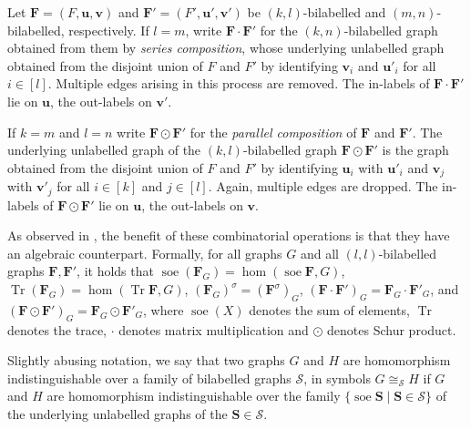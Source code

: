 \documentclass[a4paper,onecolumn,11pt,accepted=2026-01-06]{quantumarticle}
\theoremstyle{plain}
\theoremstyle{remark}
\theoremstyle{definition}
\DeclareMathOperator{\tr}{Tr}
\DeclareMathOperator{\soe}{soe}
\begin{document}
Let $\boldsymbol{F} = (F, \boldsymbol{u}, \boldsymbol{v})$ and $\boldsymbol{F}' = (F', \boldsymbol{u}', \boldsymbol{v}')$ be $(k,l)$-bilabelled and $(m,n)$-bilabelled, respectively.
If $l = m$, write $\boldsymbol{F} \cdot \boldsymbol{F}'$ for the $(k, n)$-bilabelled graph obtained from them by \emph{series composition}, whose underlying unlabelled graph obtained from the disjoint union of $F$ and $F'$ by identifying $\boldsymbol{v}_i$ and $\boldsymbol{u}'_i$ for all $i \in [l]$. 
Multiple edges arising in this process are removed. 
The in-labels of $\boldsymbol{F} \cdot \boldsymbol{F}'$ lie on $\boldsymbol{u}$, the out-labels on $\boldsymbol{v}'$.


If $k = m$ and $l = n$ %
write $\boldsymbol{F} \odot \boldsymbol{F}'$ for the \emph{parallel composition} of $\boldsymbol{F}$ and $\boldsymbol{F}'$. 
The underlying unlabelled graph of the $(k, l)$-bilabelled graph $\boldsymbol{F} \odot \boldsymbol{F}'$ is the graph obtained from the disjoint union of $F$ and $F'$ by identifying $\boldsymbol{u}_i$ with $\boldsymbol{u}'_i$ and $\boldsymbol{v}_j$ with $\boldsymbol{v}'_j$  for all $i \in [k]$ and $j \in [l]$. 
Again, multiple edges are dropped. The in-labels of $\boldsymbol{F} \odot \boldsymbol{F}'$ lie on $\boldsymbol{u}$, the out-labels on $\boldsymbol{v}$.
    
As observed in \cite{david-laura,grohe_homomorphism_2022}, the benefit of these combinatorial operations is that they have an algebraic counterpart. Formally, for all graphs $G$ and all $(l, l)$-bilabelled graphs $\boldsymbol{F}, \boldsymbol{F}'$, it holds that $\soe(\boldsymbol{F}_G) = \hom(\soe \boldsymbol{F}, G) $, $\tr(\boldsymbol{F}_G) = \hom(\tr \boldsymbol{F}, G)$, $(\boldsymbol{F}_G)^\sigma = (\boldsymbol{F}^\sigma)_G$, $(\boldsymbol{F} \cdot \boldsymbol{F}')_G = \boldsymbol{F}_G \cdot \boldsymbol{F}'_G$, and $(\boldsymbol{F} \odot \boldsymbol{F}')_G = \boldsymbol{F}_G \odot \boldsymbol{F}'_G$, where $\soe(X)$ denotes the sum of elements, $\tr$ denotes the trace, $\cdot$ denotes matrix multiplication and $\odot$ denotes Schur product.  

Slightly abusing notation, we say that two graphs $G$ and $H$ are homomorphism indistinguishable over a family of bilabelled graphs $\mathcal{S}$, in symbols $G \cong_{\mathcal{S}} H$ if $G$ and $H$ are homomorphism indistinguishable over the family $\{\soe \boldsymbol{S} \mid \boldsymbol{S} \in \mathcal{S}\}$ of the underlying unlabelled graphs of the $\boldsymbol{S} \in \mathcal{S}$.
\end{document}
